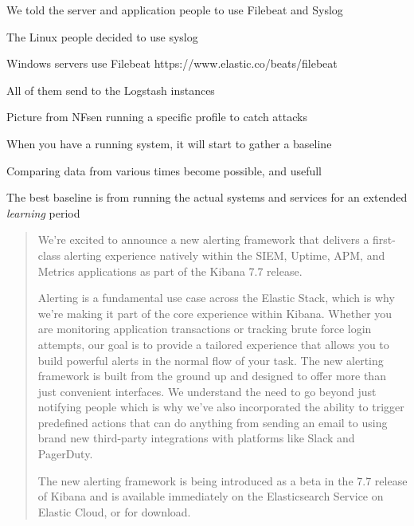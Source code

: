 \documentclass[Screen16to9,17pt]{foils}
\begin{document}


\begin{quote}

\end{quote}

\begin{list2}
\item We told the server and application people to use Filebeat and Syslog
\item The Linux people decided to use syslog
\item Windows servers use Filebeat \link{}https://www.elastic.co/beats/filebeat
\item All of them send to the Logstash instances
\end{list2}



\begin{list2}
\item Picture from NFsen running a specific profile to catch attacks
\item When you have a running system, it will start to gather a baseline
\item Comparing data from various times become possible, and usefull
\item The best baseline is from running the actual systems and services for an extended \emph{learning} period
\end{list2}



\begin{quote}\small
We’re excited to announce a new alerting framework that delivers a first-class alerting experience natively within the SIEM, Uptime, APM, and Metrics applications as part of the Kibana 7.7 release.

Alerting is a fundamental use case across the Elastic Stack, which is why we’re making it part of the core experience within Kibana. Whether you are monitoring application transactions or tracking brute force login attempts, our goal is to provide a tailored experience that allows you to build powerful alerts in the normal flow of your task. The new alerting framework is built from the ground up and designed to offer more than just convenient interfaces. We understand the need to go beyond just notifying people which is why we’ve also incorporated the ability to trigger predefined actions that can do anything from sending an email to using brand new third-party integrations with platforms like Slack and PagerDuty.

The new alerting framework is being introduced as a beta in the 7.7 release of Kibana and is available immediately on the Elasticsearch Service on Elastic Cloud, or for download.
\end{quote}
\end{document}
